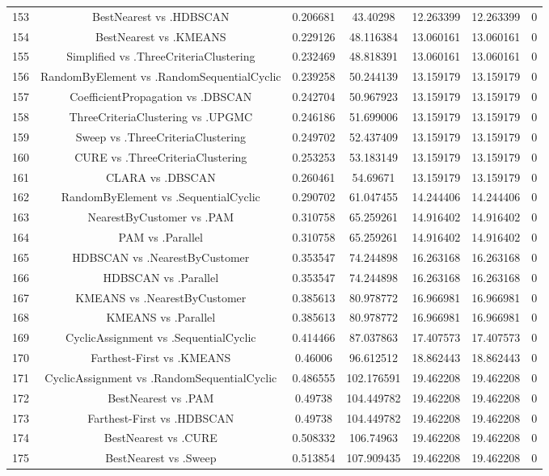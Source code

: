 \documentclass[a4paper,10pt]{article}
\begin{document}
\begin{landscape}
\begin{table}[!htp]
\begin{tabular}{ccccccc}
153&BestNearest vs .HDBSCAN&0.206681&43.40298&12.263399&12.263399&0\\
154&BestNearest vs .KMEANS&0.229126&48.116384&13.060161&13.060161&0\\
155&Simplified vs .ThreeCriteriaClustering&0.232469&48.818391&13.060161&13.060161&0\\
156&RandomByElement vs .RandomSequentialCyclic&0.239258&50.244139&13.159179&13.159179&0\\
157&CoefficientPropagation vs .DBSCAN&0.242704&50.967923&13.159179&13.159179&0\\
158&ThreeCriteriaClustering vs .UPGMC&0.246186&51.699006&13.159179&13.159179&0\\
159&Sweep vs .ThreeCriteriaClustering&0.249702&52.437409&13.159179&13.159179&0\\
160&CURE vs .ThreeCriteriaClustering&0.253253&53.183149&13.159179&13.159179&0\\
161&CLARA vs .DBSCAN&0.260461&54.69671&13.159179&13.159179&0\\
162&RandomByElement vs .SequentialCyclic&0.290702&61.047455&14.244406&14.244406&0\\
163&NearestByCustomer vs .PAM&0.310758&65.259261&14.916402&14.916402&0\\
164&PAM vs .Parallel&0.310758&65.259261&14.916402&14.916402&0\\
165&HDBSCAN vs .NearestByCustomer&0.353547&74.244898&16.263168&16.263168&0\\
166&HDBSCAN vs .Parallel&0.353547&74.244898&16.263168&16.263168&0\\
167&KMEANS vs .NearestByCustomer&0.385613&80.978772&16.966981&16.966981&0\\
168&KMEANS vs .Parallel&0.385613&80.978772&16.966981&16.966981&0\\
169&CyclicAssignment vs .SequentialCyclic&0.414466&87.037863&17.407573&17.407573&0\\
170&Farthest-First vs .KMEANS&0.46006&96.612512&18.862443&18.862443&0\\
171&CyclicAssignment vs .RandomSequentialCyclic&0.486555&102.176591&19.462208&19.462208&0\\
172&BestNearest vs .PAM&0.49738&104.449782&19.462208&19.462208&0\\
173&Farthest-First vs .HDBSCAN&0.49738&104.449782&19.462208&19.462208&0\\
174&BestNearest vs .CURE&0.508332&106.74963&19.462208&19.462208&0\\
175&BestNearest vs .Sweep&0.513854&107.909435&19.462208&19.462208&0\\

\end{tabular}
\end{table}
\end{landscape}
\end{document}
